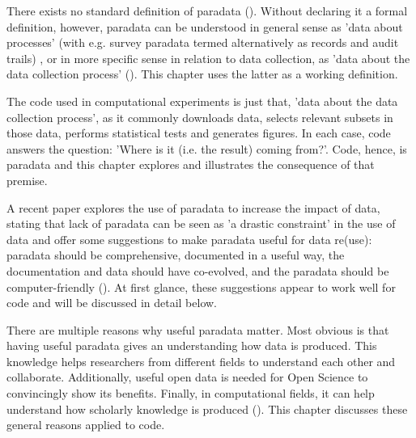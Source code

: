 

There exists no standard definition of paradata (\cite{nicolaas2011survey,skold2022interrogating,huvila2022improving}).
Without declaring it a formal definition, however,
paradata can be understood in general sense as 'data about processes’ (with e.g. survey paradata
termed alternatively as records and audit trails) \cite{nicolaas2011survey},
or in more specific sense in relation to data collection, as 'data about the data collection process' (\cite{choumert2019using}).
This chapter uses the latter as a working definition.


The code used in computational experiments is just that, 
'data about the data collection 
process', as it commonly downloads data,
selects relevant subsets in those data,
performs statistical tests and generates figures.
In each case, code answers the question: 
'Where is it (i.e. the result) coming from?'.
Code, hence, is paradata and this chapter explores and illustrates the
consequence of that premise.


A recent paper explores the use of paradata to increase the impact of data,
stating that lack of paradata can be seen as 'a drastic constraint'
in the use of data and offer some suggestions to 
make paradata useful for data re(use):
paradata should be comprehensive, documented in a useful way, 
the documentation and data should have co-evolved, 
and the paradata should be computer-friendly (\cite{huvila2022improving}).
At first glance, these suggestions appear to work well for code
and will be discussed in detail below.


There are multiple reasons why useful paradata matter. 
Most obvious is that having useful paradata gives an understanding how
data is produced.
This knowledge helps researchers from different fields to understand each other
and collaborate.
Additionally, useful open data is needed for Open Science to convincingly show
its benefits.
Finally, in computational fields, 
it can help understand how scholarly knowledge is produced (\cite{huvila2022improving}).
This chapter discusses these general reasons applied to code.

